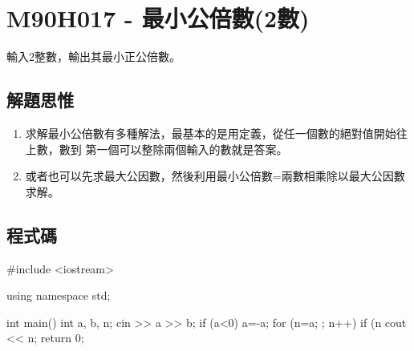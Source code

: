 \section{M90H017 - 最小公倍數(2數)}
輸入2整數，輸出其最小正公倍數。
\subsection{解題思惟}
\begin{enumerate}
	\item 求解最小公倍數有多種解法，最基本的是用定義，從任一個數的絕對值開始往上數，數到
	第一個可以整除兩個輸入的數就是答案。
	\item 或者也可以先求最大公因數，然後利用最小公倍數=兩數相乘除以最大公因數求解。
\end{enumerate}
\subsection{程式碼}
\begin{cppcode}
#include <iostream>

using namespace std;

int main()
{
	int a, b, n;
	cin >> a >> b;
	if (a<0) a=-a;
	for (n=a; ; n++) {
		if (n%
	}
	cout << n;
	return 0;
}
\end{cppcode}
